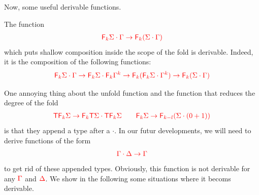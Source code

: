Now, some useful derivable functions.
\begin{example}\label{ex:PermuteScopeShallowFold}
The function
\begin{align*}
{\color{red}{{\color{red}{\mathsf F_{k}}}\Sigma\cdot \Gamma\to {\color{red}{\mathsf F_{k}}}(\Sigma\cdot \Gamma)}}
\end{align*}
which puts shallow composition inside the scope of the fold is derivable. Indeed, it is the composition of the following functions:
\begin{align*}
{\color{red}{{\color{red}{\mathsf F_{k}}}\Sigma\cdot \Gamma\to {\color{red}{\mathsf F_{k}}}\Sigma\cdot {\color{red}{\mathsf F_{k}}}\Gamma^k\to {\color{red}{\mathsf F_{k}}}({\color{red}{\mathsf F_{k}}}\Sigma\cdot \Gamma^k)\to {\color{red}{\mathsf F_{k}}}(\Sigma\cdot \Gamma)}}
\end{align*} 
\end{example}

One annoying thing about the unfold function and the function that reduces the degree of the fold
\begin{align*}
{\color{red}{{\color{red}{\mathsf T}}{\color{red}{\mathsf F_{k}}}\Sigma \to {\color{red}{\mathsf F_{k}}}{\color{red}{\mathsf T}}\Sigma\cdot  {\color{red}{\mathsf T}}{\color{red}{\mathsf F_{k}}}\Sigma \qquad {\color{red}{\mathsf F_{k}}}\Sigma \to {\color{red}{\mathsf F_{k-l}}}(\Sigma\cdot(0+1))}}
 \end{align*}
 is that they append a type after a $\cdot$. In our futur developments, we will need to derive functions of the form
 \begin{align*}
 {\color{red}{\Gamma\cdot\Delta\to \Gamma}}
 \end{align*}
 to get rid of these appended types. Obviously, this function is not derivable for any ${\color{red}{\Gamma}}$ and ${\color{red}{\Delta}}$. We show in the following some situations where it becoms derivable.
 
